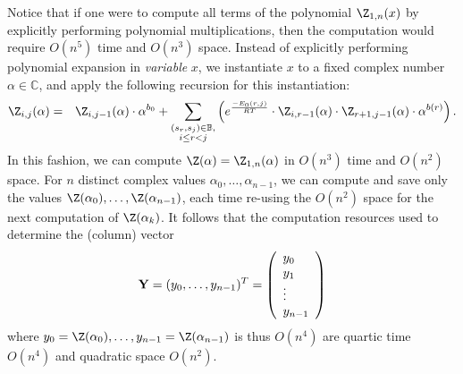 Notice that if one were to compute all terms of the polynomial $\Z_{1,n}(x)$
by explicitly performing polynomial multiplications,
then the computation would require $O(n^5)$ time and $O(n^3)$ space.
Instead of explicitly performing polynomial expansion in {\em variable} $x$,
we instantiate $x$ to a fixed complex number $\alpha \in \mathbb{C}$, and apply
the following recursion for this instantiation:
\begin{eqnarray}
\label{eq:RNAborNussRecursionInstantiated}
\Z_{i,j}(\alpha) &= &\Z_{i,j-1}(\alpha) \cdot \alpha^{b_0} +
\sum_{\substack{(s_r,s_j) \in \mathbb{B},\\i\le r<j}}
\left(e^{\frac{-E_0(r,j)}{RT}}\cdot
\Z_{i,r-1}(\alpha)\cdot\Z_{r+1,j-1}(\alpha)\cdot \alpha^{b(r)} \right).
\end{eqnarray}
In this fashion, we can compute $\Z(\alpha)=\Z_{1,n}(\alpha)$ in
$O(n^3)$ time and $O(n^2)$ space. For $n$ distinct complex values
$\alpha_0,\ldots,\alpha_{n-1}$, we can compute and save only the
values $\Z(\alpha_0),\ldots, \Z(\alpha_{n-1})$, each time re-using the
$O(n^2)$ space for the next computation of $\Z(\alpha_k)$. It follows that
the computation resources used to determine the (column) vector
\begin{eqnarray}
\label{eq:defY}
{\bf Y} = (y_0,\ldots,y_{n-1})^T =
\left(
\begin{array}{l}
y_0\\
y_1\\
\vdots \\
y_{n-1}\\
\end{array}
\right)
\end{eqnarray}
where
$y_0=\Z(\alpha_0),\ldots, y_{n-1}=\Z(\alpha_{n-1})$ is thus
$O(n^4)$ are quartic time $O(n^4)$ and quadratic space $O(n^2)$.

